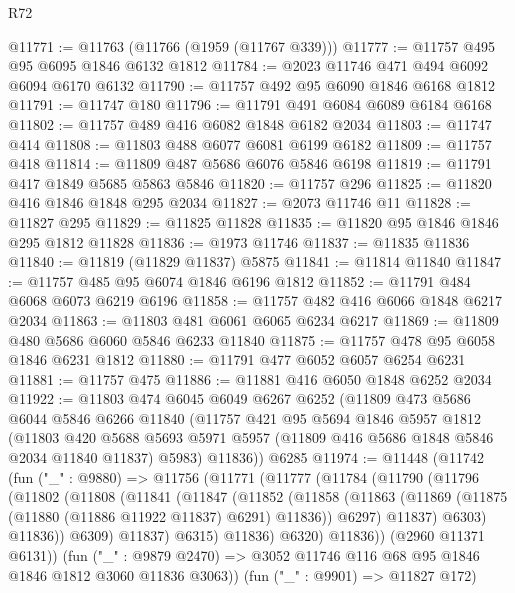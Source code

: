 \begin{lexlean}{R72}
\begin{coremodule}
@11771 := @11763 (@11766 (@1959 (@11767 @339)))
@11777 := @11757 @495 @95 @6095 @1846 @6132 @1812
@11784 := @2023 @11746 @471 @494 @6092 @6094 @6170 @6132
@11790 := @11757 @492 @95 @6090 @1846 @6168 @1812
@11791 := @11747 @180
@11796 := @11791 @491 @6084 @6089 @6184 @6168
@11802 := @11757 @489 @416 @6082 @1848 @6182 @2034
@11803 := @11747 @414
@11808 := @11803 @488 @6077 @6081 @6199 @6182
@11809 := @11757 @418
@11814 := @11809 @487 @5686 @6076 @5846 @6198
@11819 := @11791 @417 @1849 @5685 @5863 @5846
@11820 := @11757 @296
@11825 := @11820 @416 @1846 @1848 @295 @2034
@11827 := @2073 @11746 @11
@11828 := @11827 @295
@11829 := @11825 @11828
@11835 := @11820 @95 @1846 @1846 @295 @1812 @11828
@11836 := @1973 @11746
@11837 := @11835 @11836
@11840 := @11819 (@11829 @11837) @5875
@11841 := @11814 @11840
@11847 := @11757 @485 @95 @6074 @1846 @6196 @1812
@11852 := @11791 @484 @6068 @6073 @6219 @6196
@11858 := @11757 @482 @416 @6066 @1848 @6217 @2034
@11863 := @11803 @481 @6061 @6065 @6234 @6217
@11869 := @11809 @480 @5686 @6060 @5846 @6233 @11840
@11875 := @11757 @478 @95 @6058 @1846 @6231 @1812
@11880 := @11791 @477 @6052 @6057 @6254 @6231
@11881 := @11757 @475
@11886 := @11881 @416 @6050 @1848 @6252 @2034
@11922 := @11803
    @474
    @6045
    @6049
    @6267
    @6252
    (@11809
      @473
      @5686
      @6044
      @5846
      @6266
      @11840
      (@11757
        @421
        @95
        @5694
        @1846
        @5957
        @1812
        (@11803
          @420
          @5688
          @5693
          @5971
          @5957
          (@11809 @416 @5686 @1848 @5846 @2034 @11840 @11837)
          @5983)
        @11836))
    @6285
@11974 := @11448
    (@11742
      (fun ("_" : @9880) =>
      @11756
        (@11771
          (@11777
            (@11784
              (@11790
                (@11796
                  (@11802
                    (@11808
                      (@11841
                        (@11847
                          (@11852
                            (@11858
                              (@11863
                                (@11869 (@11875 (@11880 (@11886 @11922 @11837) @6291) @11836))
                                @6297)
                              @11837)
                            @6303)
                          @11836))
                      @6309)
                    @11837)
                  @6315)
                @11836)
              @6320)
            @11836))
        (@2960 @11371 @6131))
      (fun ("_" : @9879 @2470) => @3052 @11746 @116 @68 @95 @1846 @1846 @1812 @3060 @11836 @3063))
    (fun ("_" : @9901) => @11827 @172)

\end{coremodule}
\end{lexlean}
